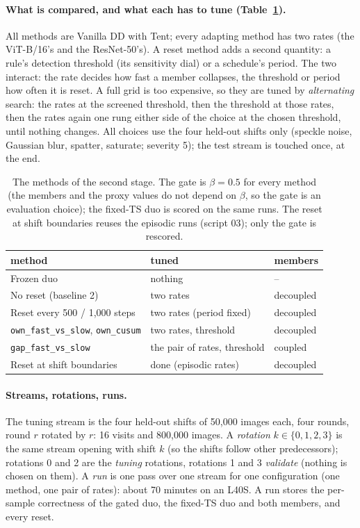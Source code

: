 \documentclass[10pt]{article}
\newcommand{\rl}[1]{\texttt{#1}}
\newcommand{\vit}{ViT-B/16}
\newcommand{\rn}{ResNet-50}
\begin{document}
\paragraph{What is compared, and what each has to tune (Table~\ref{tab:methods}).} All methods are Vanilla DD with Tent; every adapting method has two rates (the \vit{}'s and the \rn{}'s). A reset method adds a second quantity: a rule's detection threshold (its sensitivity dial) or a schedule's period. The two interact: the rate decides how fast a member collapses, the threshold or period how often it is reset. A full grid is too expensive, so they are tuned by \emph{alternating} search: the rates at the screened threshold, then the threshold at those rates, then the rates again one rung either side of the choice at the chosen threshold, until nothing changes. All choices use the four held-out shifts only (speckle noise, Gaussian blur, spatter, saturate; severity 5); the test stream is touched once, at the end.

\begin{table}[t]
  \centering\small
  \caption{The methods of the second stage. The gate is $\beta = 0.5$ for every method (the members and the proxy values do not depend on $\beta$, so the gate is an evaluation choice); the fixed-TS duo is scored on the same runs. The reset at shift boundaries reuses the episodic runs (script 03); only the gate is rescored.}
  \label{tab:methods}
  \begin{tabular}{@{}lll@{}}
    \toprule
    method & tuned & members \\
    \midrule
    Frozen duo & nothing & -- \\
    No reset (baseline 2) & two rates & decoupled \\
    Reset every 500 / 1,000 steps & two rates (period fixed) & decoupled \\
    \rl{own\_fast\_vs\_slow}, \rl{own\_cusum} & two rates, threshold & decoupled \\
    \rl{gap\_fast\_vs\_slow} & the pair of rates, threshold & coupled \\
    Reset at shift boundaries & done (episodic rates) & decoupled \\
    \bottomrule
  \end{tabular}
\end{table}

\paragraph{Streams, rotations, runs.} The tuning stream is the four held-out shifts of 50,000 images each, four rounds, round $r$ rotated by $r$: 16 visits and 800,000 images. A \emph{rotation} $k \in \{0, 1, 2, 3\}$ is the same stream opening with shift $k$ (so the shifts follow other predecessors); rotations 0 and 2 are the \emph{tuning} rotations, rotations 1 and 3 \emph{validate} (nothing is chosen on them). A \emph{run} is one pass over one stream for one configuration (one method, one pair of rates): about 70 minutes on an L40S. A run stores the per-sample correctness of the gated duo, the fixed-TS duo and both members, and every reset.
\end{document}

